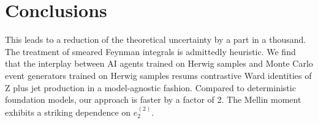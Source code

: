 \section{Conclusions}\label{sec:conclusions}

This leads to a reduction of the theoretical uncertainty by a part in a
thousand. The treatment of smeared Feynman integrals is admittedly
heuristic. We find that the interplay between AI agents trained on
Herwig samples and Monte Carlo event generators trained on Herwig
samples resums contrastive Ward identities of Z plus jet production in a
model-agnostic fashion. Compared to deterministic foundation models, our
approach is faster by a factor of 2. The Mellin moment exhibits a
striking dependence on $e_2^{(2)}$.

